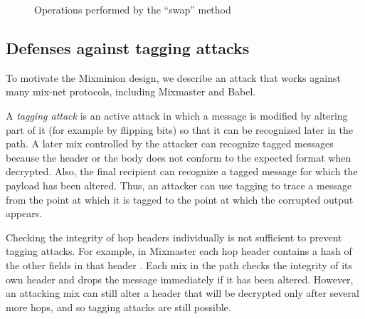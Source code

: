 \documentclass[times,10pt,twocolumn]{article}
\begin{document}
\begin{figure}
\begin{center}
\caption{Operations performed by the ``swap'' method} 
\end{center}
\end{figure}

\subsection{Defenses against tagging attacks}
\label{subsec:tagging-attacks}
\label{subsec:tagging-defenses}

To motivate the Mixminion design, we describe an attack
that works against many mix-net protocols, including Mixmaster and Babel.

A {\em tagging attack} is an active attack in which a message is
modified by altering part of it (for example by flipping bits) so
that it can be recognized later in the path.  A later mix controlled by
the attacker can recognize tagged messages because the header or the
body does
not conform to the expected format when decrypted.  Also, the final
recipient can recognize a tagged message for which the payload has
been altered.  Thus, an attacker can use tagging to trace a message from the
point at which it is tagged to the point at which the corrupted output
appears. 

Checking the integrity of hop headers individually is not
sufficient to prevent tagging attacks.  For example, in Mixmaster
each hop header contains a hash of the other fields in that header
\cite{mixmaster-spec}.
Each mix in the path checks the integrity of its own header and drops
the message immediately if it has been altered.  However, 
an attacking mix can still alter a header that will be decrypted
only after several more hops, and so tagging attacks are still possible.
\end{document}
